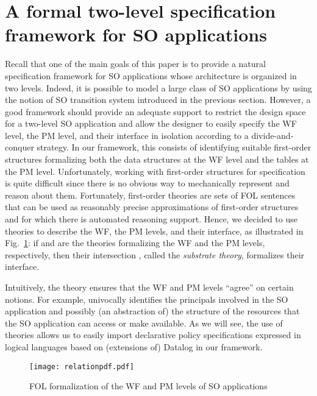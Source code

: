 \documentclass[conference]{IEEEtran}
\begin{document}
\section{A formal two-level specification framework  for SO applications}\label{sec:framework}
Recall that one of the main goals of this paper is to
provide a natural specification framework for SO applications whose
architecture is organized in two levels.  Indeed, it is possible to
model a large class of SO applications by using the notion of SO
transition system introduced in the previous section.  However, a good
framework should provide an adequate support to restrict the design
space for a two-level SO application and allow the designer to easily
specify the WF level, the PM level, and their interface in isolation
according to a divide-and-conquer strategy.  In our framework, this
consists of identifying suitable first-order structures formalizing
both the data structures at the WF level and the tables at the PM
level.  Unfortunately, working with first-order structures for
specification is quite difficult since there is no obvious way to
mechanically represent and reason about them.  Fortunately,
first-order theories are sets of FOL sentences that can be used as
reasonably precise approximations of first-order structures and for
which there is automated reasoning support.  Hence, we decided to use
theories to describe the WF, the PM levels, and their interface, as illustrated in 
Fig.~\ref{fig:ths-rels}: if  and  are the theories 
formalizing the WF and the PM levels, respectively, then their intersection , called the \emph{substrate theory}, formalizes their interface.

Intuitively, the theory  ensures that the WF and PM levels
``agree'' on certain notions. For example,  univocally
identifies the principals involved in the SO application and possibly
(an abstraction of) the {structure} of the resources that the SO
application can access or make available.  As we will see, the use of
theories allows us to easily import declarative policy specifications
expressed in logical languages based on (extensions of) Datalog in our
framework.
\label{sec:modelling}
\begin{figure}[tb]
\centering
\vspace*{-0.2cm}
\texttt{[image: relationpdf.pdf]}
\vspace*{-0.5cm}
\caption{\label{fig:ths-rels}FOL formalization of the WF and PM levels
  of SO applications}
\end{figure}
\end{document}
